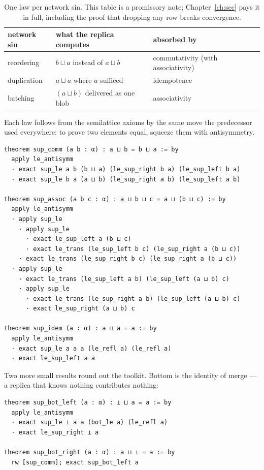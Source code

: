 \documentclass[12pt, a4paper, openright]{book}
\theoremstyle{thmstyle}
\theoremstyle{defstyle}
\begin{document}
\begin{table}[H]
  \centering
  \begin{tabular}{lll}
    \toprule
    network sin & what the replica computes & absorbed by \\
    \midrule
    reordering  & $b \sqcup a$ instead of $a \sqcup b$ & commutativity (with associativity) \\
    duplication & $a \sqcup a$ where $a$ sufficed      & idempotence \\
    batching    & $(a \sqcup b)$ delivered as one blob & associativity \\
    \bottomrule
  \end{tabular}
  \caption{One law per network sin. This table is a promissory note;
    Chapter~\ref{ch:sec} pays it in full, including the proof that
    dropping any row breaks convergence.}
  \label{tab:sins}
\end{table}

Each law follows from the semilattice axioms by the same move the
predecessor used everywhere: to prove two elements equal, squeeze them
with antisymmetry.

\begin{verbatim}
theorem sup_comm (a b : α) : a ⊔ b = b ⊔ a := by
  apply le_antisymm
  · exact sup_le a b (b ⊔ a) (le_sup_right b a) (le_sup_left b a)
  · exact sup_le b a (a ⊔ b) (le_sup_right a b) (le_sup_left a b)

theorem sup_assoc (a b c : α) : a ⊔ b ⊔ c = a ⊔ (b ⊔ c) := by
  apply le_antisymm
  · apply sup_le
    · apply sup_le
      · exact le_sup_left a (b ⊔ c)
      · exact le_trans (le_sup_left b c) (le_sup_right a (b ⊔ c))
    · exact le_trans (le_sup_right b c) (le_sup_right a (b ⊔ c))
  · apply sup_le
    · exact le_trans (le_sup_left a b) (le_sup_left (a ⊔ b) c)
    · apply sup_le
      · exact le_trans (le_sup_right a b) (le_sup_left (a ⊔ b) c)
      · exact le_sup_right (a ⊔ b) c

theorem sup_idem (a : α) : a ⊔ a = a := by
  apply le_antisymm
  · exact sup_le a a a (le_refl a) (le_refl a)
  · exact le_sup_left a a
\end{verbatim}

Two more small results round out the toolkit. Bottom is the identity of
merge --- a replica that knows nothing contributes nothing:

\begin{verbatim}
theorem sup_bot_left (a : α) : ⊥ ⊔ a = a := by
  apply le_antisymm
  · exact sup_le ⊥ a a (bot_le a) (le_refl a)
  · exact le_sup_right ⊥ a

theorem sup_bot_right (a : α) : a ⊔ ⊥ = a := by
  rw [sup_comm]; exact sup_bot_left a
\end{verbatim}
\end{document}

